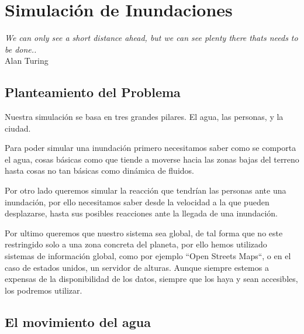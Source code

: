 
\chapter*{Simulación de Inundaciones} \label{cap2}


\begin{flushright}
\begin{minipage}{7.85cm}
    {\em We can only see a short distance ahead, but we can see plenty there thats needs to be done..} \\  Alan Turing
\end{minipage}
\end{flushright}

\vspace*{5mm}

\section*{Planteamiento del Problema}

Nuestra simulación se basa en tres grandes pilares. El agua, las personas, y la ciudad. 

Para poder simular una inundación primero necesitamos saber como se comporta el agua, cosas básicas como que tiende a moverse hacia las zonas bajas del terreno hasta cosas no tan básicas como dinámica de fluidos.

Por otro lado queremos simular la reacción que tendrían las personas ante una inundación, por ello necesitamos saber desde la velocidad a la que pueden desplazarse, hasta sus posibles reacciones ante la llegada de una inundación.

Por ultimo queremos que nuestro sistema sea global, de tal forma que no este restringido solo a una zona concreta del planeta, por ello hemos utilizado sistemas de información global, como por ejemplo ``Open Streets Maps``, o en el caso de estados unidos, un servidor de alturas. Aunque siempre estemos a expensas de la disponibilidad de los datos, siempre que los haya y sean accesibles, los podremos utilizar.

\section*{El movimiento del agua}

